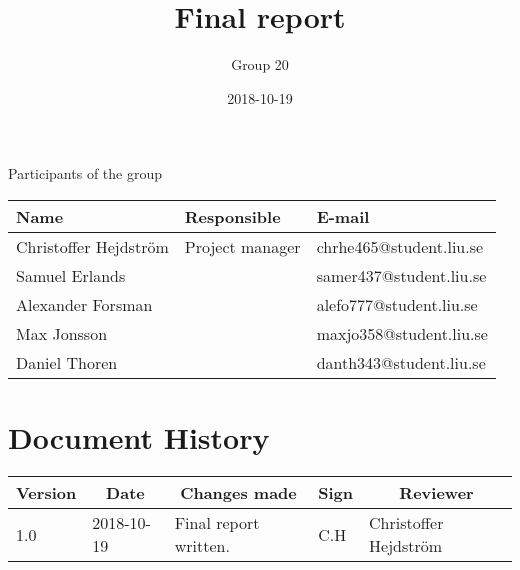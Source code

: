 \documentclass[10pt,oneside,english]{lips}
\title{Final report}
\author{Group 20}
\date{2018-10-19}
\begin{document}
  \setlength\parindent{0pt}
  \maketitle
  
  \cleardoublepage
  \makeprojectid
  
  \begin{center}
    \Large Participants of the group
  \end{center}
  \begin{center}
    \begin{tabular}{|l|l|l|}
      \hline
      \textbf{Name} & \textbf{Responsible} & \textbf{E-mail}\\ \hline
      Christoffer Hejdström & Project manager & chrhe465@student.liu.se \\ \hline
      Samuel Erlands & & samer437@student.liu.se \\ \hline
      Alexander Forsman & & alefo777@student.liu.se\\ \hline
      Max Jonsson & & maxjo358@student.liu.se\\ \hline
      Daniel Thoren & & danth343@student.liu.se\\
      \hline
    \end{tabular}
  \end{center}
  
  
  \cleardoublepage
  \tableofcontents
  
  \cleardoublepage
  \section*{Document History}
  \begin{tabular}{p{}|p{}|p{}|p{}|p{}} 
    \multicolumn{1}{c}{\bfseries Version} & 
    \multicolumn{1}{|c}{\bfseries Date} & 
    \multicolumn{1}{|c}{\bfseries Changes made} & 
    \multicolumn{1}{|c}{\bfseries Sign} & 
    \multicolumn{1}{|c}{\bfseries Reviewer}\\
    \hline
    \hline
    1.0 & 2018-10-19 & Final report written. & C.H & Christoffer Hejdström \\ \hline
  \end{tabular}
  
  \cleardoublepage
  \cfoot{\thepage}
  
    
  
  
  
  
  \clearpage
  
  \cleardoublepage
  \appendix
  
  
\end{document}
